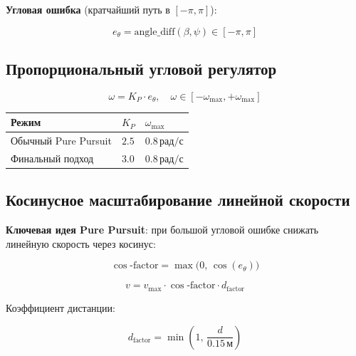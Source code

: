 \textbf{Угловая ошибка} (кратчайший путь в $[-\pi, \pi]$):

\begin{equation}
  e_\theta = \mathrm{angle\_diff}(\beta, \psi) \in [-\pi, \pi]
  \label{eq:angle_error}
\end{equation}

\subsection{Пропорциональный угловой регулятор}

\begin{equation}
  \omega = K_P \cdot e_\theta, \quad
  \omega \in [-\omega_{\max}, +\omega_{\max}]
  \label{eq:angular_control}
\end{equation}

\begin{center}
\begin{tabular}{lll}
\toprule
\textbf{Режим} & $K_P$ & $\omega_{\max}$\\
\midrule
Обычный Pure Pursuit & $2.5$ & $0.8\,\text{рад/с}$\\
Финальный подход & $3.0$ & $0.8\,\text{рад/с}$\\
\bottomrule
\end{tabular}
\end{center}

\subsection{Косинусное масштабирование линейной скорости}

\textbf{Ключевая идея Pure Pursuit}: при большой угловой ошибке снижать
линейную скорость через косинус:

\begin{equation}
  \cos\text{-factor} = \max\bigl(0,\, \cos(e_\theta)\bigr)
  \label{eq:cos_factor}
\end{equation}

\begin{equation}
  v = v_{\max} \cdot \cos\text{-factor} \cdot d_{\text{factor}}
  \label{eq:linear_speed}
\end{equation}

Коэффициент дистанции:

\begin{equation}
  d_{\text{factor}} = \min\!\left(1,\, \frac{d}{0.15\,\text{м}}\right)
  \label{eq:dist_factor}
\end{equation}

